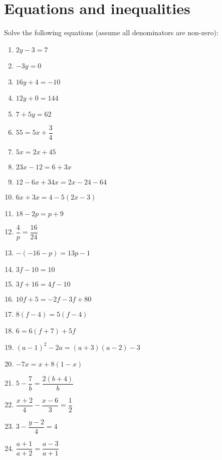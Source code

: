 \chapter{Equations and inequalities}

\begin{exercises}{}
{
Solve the following equations (assume all denominators are non-zero): \\
\begin{multicols}{2}
\begin{enumerate}[itemsep=6pt, label=\textbf{\arabic*}. ] 
\item   $2y-3=7$
\item   $-3y=0$        
\item   $16y+4=-10$        
\item   $12y+0=144$
\item   $7+5y=62$       
\item  $55=5x+\dfrac{3}{4}$ 
\item   $5x=2x+45$        
\item  $23x-12=6+3x$
\item   $12-6x+34x=2x-24-64$
\item   $6x+3x=4-5(2x-3)$
\item   $18-2p=p+9$   
\item   $\dfrac{4}{p}=\dfrac{16}{24}$
\item   $-(-16-p)=13p-1$
\item   $3f-10=10$
\item   $3f+16=4f-10$
\item   $10f+5=-2f-3f+80$
\item   $8(f-4)=5(f-4)$
\item  $6=6(f+7)+5f$      
\item $(a-1)^{2} - 2a = (a+3)(a-2) - 3$
\item $-7x = x+8(1-x)$ 
\item $5-\dfrac{7}{b} = \dfrac{2(b+4)}{b}$
\item $\dfrac{x+2}{4} - \dfrac{x-6}{3} = \dfrac{1}{2}$
\item $ 3 - \dfrac{y-2}{4} = 4$
\item $ \dfrac{a+1}{a+2} = \dfrac{a-3}{a+1}$
\end{enumerate}
\end{multicols}

}
\end{exercises}


